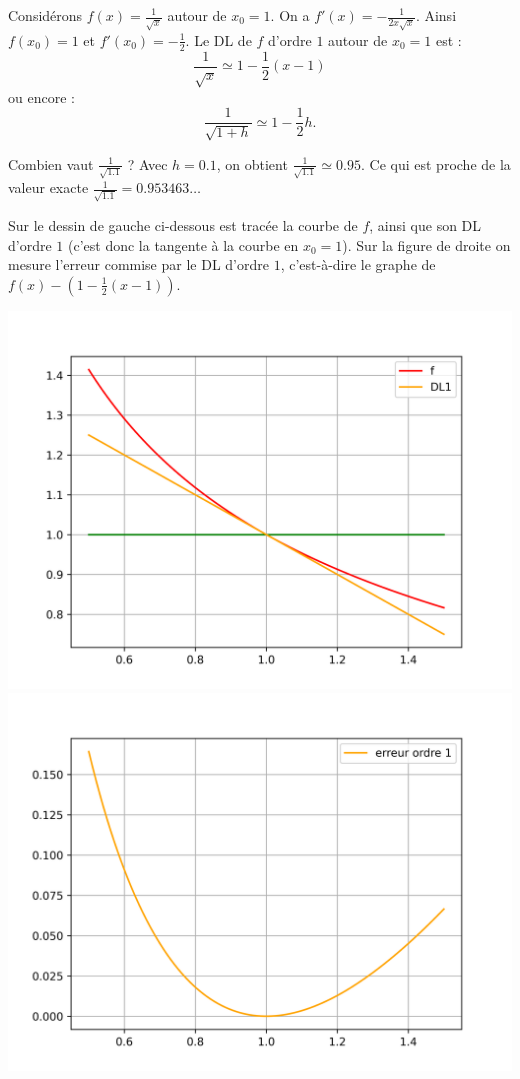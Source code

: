 \documentclass[11pt,class=report,crop=false]{standalone}
\begin{document}
\begin{exemple}
Considérons $f(x) = \frac{1}{\sqrt{x}}$ autour de $x_0 = 1$. 
On a $f'(x) = -\frac{1}{2x\sqrt{x}}$. Ainsi $f(x_0) = 1$ et $f'(x_0) = -\frac{1}{2}$. Le DL de $f$ d'ordre $1$ autour de $x_0 = 1$ est :
$$\frac{1}{\sqrt{x}} \simeq 1 - \frac{1}{2}(x-1)$$
ou encore :
$$\frac{1}{\sqrt{1+h}} \simeq 1 - \frac{1}{2}h.$$



Combien vaut $\frac{1}{\sqrt{1.1}}$ ? Avec $h=0.1$, on obtient $\frac{1}{\sqrt{1.1}} \simeq 0.95$. 
Ce qui est proche de la valeur exacte $\frac{1}{\sqrt{1.1}} = 0.953463\ldots$ 

Sur le dessin de gauche ci-dessous est tracée la courbe de $f$, ainsi que son DL d'ordre $1$ (c'est donc la tangente à la courbe en $x_0=1$). 
Sur la figure de droite on mesure l'erreur commise par le DL d'ordre $1$, c'est-à-dire le graphe de $f(x)- (1 - \frac{1}{2}(x-1))$.

\begin{center}
  \includegraphics[scale=\myscale,scale=0.5]{figures/approx-dl-01}
  \includegraphics[scale=\myscale,scale=0.5]{figures/approx-dl-02} 
\end{center}

\end{exemple}
\end{document}
